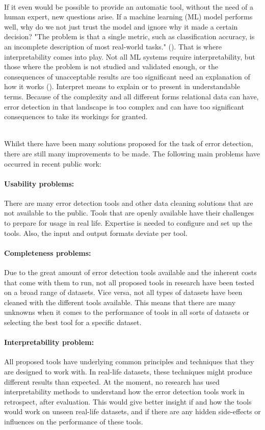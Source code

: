 ~\\If it even would be possible to provide an automatic tool, without the need of a human expert, new questions arise. 
If a machine learning (ML) model performs well, why do we not just trust the model and ignore why it made a certain decision? "The problem is that a single metric, such as classification accuracy, is an incomplete description of most real-world tasks." (\cite{Molnar2020-do}).
That is where interpretability comes into play. Not all ML systems require interpretability, but those where the problem is not studied and validated enough, or the consequences of unacceptable results are too significant need an explanation of how it works (\cite{Doshi-Velez2017-ec}). Interpret means to explain or to present in understandable terms. Because of the complexity and all different forms relational data can have, error detection in that landscape is too complex and can have too significant consequences to take its workings for granted. 

~\\Whilst there have been many solutions proposed for the task of error detection, there are still many improvements to be made. The following main problems have occurred in recent public work:

\paragraph{Usability problems:} There are many error detection tools and other data cleaning solutions that are not available to the public. Tools that are openly available have their challenges to prepare for usage in real life. Expertise is needed to configure and set up the tools. Also, the input and output formats deviate per tool. 

\paragraph{Completeness problems:} Due to the great amount of error detection tools available and the inherent costs that come with them to run, not all proposed tools in research have been tested on a broad range of datasets. Vice versa, not all types of datasets have been cleaned with the different tools available. This means that there are many unknowns when it comes to the performance of tools in all sorts of datasets or selecting the best tool for a specific dataset.

\paragraph{Interpretability problem:} All proposed tools have underlying common principles and techniques that they are designed to work with. In real-life datasets, these techniques might produce different results than expected. At the moment, no research has used interpretability methods to understand how the error detection tools work in retrospect, after evaluation. This would give better insight if and how the tools would work on unseen real-life datasets, and if there are any hidden side-effects or influences on the performance of these tools.
